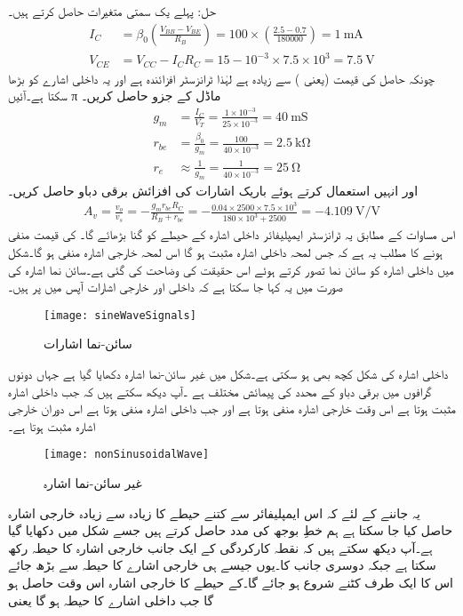 حل:	پہلے یک سمتی متغیرات حاصل کرتے ہیں۔
\begin{align*}
I_C&=\beta_0 \left(\frac{V_{BB}-V_{BE}}{R_B} \right )=100 \times \left(\frac{2.5-0.7}{180000} \right )=\SI{1}{\milli \ampere}\\
V_{CE}&=V_{CC}-I_C R_C=15-10^{-3} \times 7.5 \times 10^{3}=\SI{7.5}{\volt}
\end{align*}
چونکہ حاصل  کی قیمت   (یعنی ) سے زیادہ ہے لہٰذا ٹرانزسٹر افزائندہ ہے اور یہ داخلی اشارے کو بڑھا سکتا ہے۔آئیں π ماڈل کے جزو حاصل کریں۔
\begin{align*}
g_m &=\frac{I_C}{V_T}=\frac{1 \times 10^{-3}}{25 \times 10^{-3}}=\SI{40}{\milli \siemens}\\
r_{be}&=\frac{\beta_0}{g_m}=\frac{100}{40 \times 10^{-3}}=\SI{2.5}{\kilo \ohm}\\
r_e& \approx \frac{1}{g_m}=\frac{1}{40 \times 10^{-3}}=\SI{25}{\ohm}
\end{align*}
اور انہیں استعمال کرتے ہوئے باریک اشارات کی افزائش برقی دباو  حاصل کریں۔
\begin{align*}
A_v =\frac{v_o}{v_s}=-\frac{g_m r_{be} R_C}{ R_B+r_{be}}=-\frac{0.04 \times 2500 \times 7.5 \times 10^3}{180 \times 10^{3}+2500}=\SI[per=frac,fraction=nice]{-4.109}{\volt \per \volt}
\end{align*}
اس مساوات کے مطابق یہ ٹرانزسٹر ایمپلیفائر داخلی اشارہ  کے حیطے کو  گنا بڑھائے گا۔ کی قیمت منفی ہونے کا مطلب یہ ہے کہ جس لمحہ داخلی اشارہ مثبت ہو گا اس لمحہ خارجی اشارہ منفی ہو گا۔شکل میں داخلی اشارہ کو سائن نما تصور کرتے ہوئے اس حقیقت کی وضاحت کی گئی ہے۔سائن نما اشارہ کی صورت میں یہ کہا جا سکتا ہے کہ داخلی اور خارجی اشارات آپس میں  پر ہیں۔ 
\begin{figure}
\centering
\texttt{[image: sineWaveSignals]}
\caption{سائن-نما اشارات}
\label{شکل_سائن_نما_اشارات}
\end{figure}
داخلی اشارہ کی شکل کچھ بھی ہو سکتی ہے۔شکل   میں غیر سائن-نما اشارہ دکھایا گیا ہے جہاں دونوں گرافوں میں برقی دباو کے محدد کی پیمائش مختلف ہے ۔آپ دیکھ سکتے ہیں کہ جب داخلی اشارہ مثبت ہوتا ہے اس وقت خارجی اشارہ منفی ہوتا ہے اور جب داخلی اشارہ منفی ہوتا ہے اس دوران خارجی اشارہ مثبت ہوتا ہے۔ 
\begin{figure}
\centering
\texttt{[image: nonSinusoidalWave]}
\caption{غیر سائن-نما اشارہ}
\label{شکل_غیر_سائن_نما_اشارہ}
\end{figure}
یہ جاننے کے لئے کہ اس ایمپلیفائر سے کتنے حیطے کا زیادہ سے زیادہ خارجی اشارہ   حاصل کیا جا سکتا ہے ہم خطِ بوجھ  کی مدد حاصل کرتے ہیں جسے شکل   میں دکھایا گیا ہے۔آپ دیکھ سکتے ہیں کہ نقطہ کارکردگی کے ایک جانب خارجی اشارہ  کا حیطہ رکھ سکتا ہے جبکہ دوسری جانب  کا۔یوں جیسے ہی خارجی اشارے کا حیطہ  سے بڑھ جائے اس کا ایک طرف کٹنے شروع ہو جائے گا۔کے حیطے کا خارجی اشارہ اس وقت حاصل ہو گا جب داخلی اشارے کا حیطہ   ہو گا یعنی
